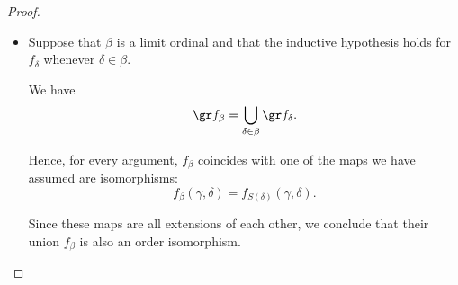 \begin{proof}
\begin{itemize}
    Thus, we only need to consider the first components if \( \delta = \varepsilon \), in which case correctness follows from \cref{thm:ordinal_multiplication_is_monotone/second}.

    Since \( f_\delta \) is an isomorphism, so is \( f_\beta \).

    \item Suppose that \( \beta \) is a limit ordinal and that the inductive hypothesis holds for \( f_\delta \) whenever \( \delta \in \beta \).

    We have
    \begin{equation*}
      \gr f_\beta = \bigcup_{\delta \in \beta} \gr f_\delta.
    \end{equation*}

    Hence, for every argument, \( f_\beta \) coincides with one of the maps we have assumed are isomorphisms:
    \begin{equation*}
      f_\beta(\gamma, \delta) = f_{S(\delta)}(\gamma, \delta).
    \end{equation*}

    Since these maps are all extensions of each other, we conclude that their union \( f_\beta \) is also an order isomorphism.
  \end{itemize}
\end{proof}

